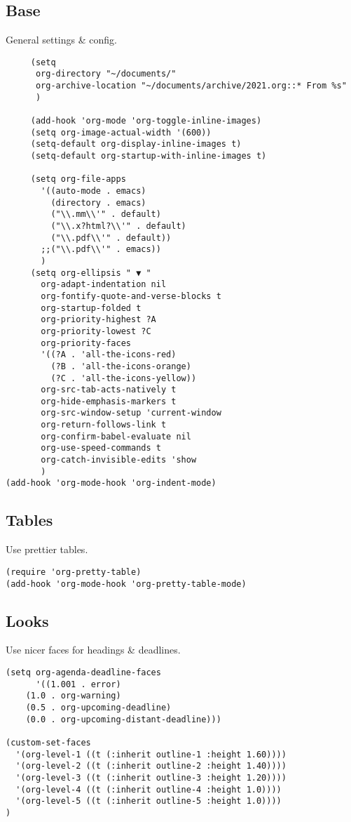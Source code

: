 \documentclass[11pt]{article}
\begin{document}
\subsection{Base}
\label{sec:org0ddaae1}
General settings \& config.
\begin{verbatim}
     (setq
      org-directory "~/documents/"
      org-archive-location "~/documents/archive/2021.org::* From %s"
      )

     (add-hook 'org-mode 'org-toggle-inline-images)
     (setq org-image-actual-width '(600))
     (setq-default org-display-inline-images t)
     (setq-default org-startup-with-inline-images t)

     (setq org-file-apps
	   '((auto-mode . emacs)
	     (directory . emacs)
	     ("\\.mm\\'" . default)
	     ("\\.x?html?\\'" . default)
	     ("\\.pdf\\'" . default)) 
	   ;;("\\.pdf\\'" . emacs))
	   )
     (setq org-ellipsis " ▼ "
	   org-adapt-indentation nil
	   org-fontify-quote-and-verse-blocks t
	   org-startup-folded t
	   org-priority-highest ?A
	   org-priority-lowest ?C
	   org-priority-faces
	   '((?A . 'all-the-icons-red)
	     (?B . 'all-the-icons-orange)
	     (?C . 'all-the-icons-yellow))
	   org-src-tab-acts-natively t
	   org-hide-emphasis-markers t
	   org-src-window-setup 'current-window
	   org-return-follows-link t
	   org-confirm-babel-evaluate nil
	   org-use-speed-commands t
	   org-catch-invisible-edits 'show
	   )
(add-hook 'org-mode-hook 'org-indent-mode)
\end{verbatim}
\subsection{Tables}
\label{sec:orgb62d908}
Use prettier tables.
\begin{verbatim}
(require 'org-pretty-table)
(add-hook 'org-mode-hook 'org-pretty-table-mode)
\end{verbatim}
\subsection{Looks}
\label{sec:org79b8676}
Use nicer faces for headings \& deadlines.
\begin{verbatim}
(setq org-agenda-deadline-faces
      '((1.001 . error)
	(1.0 . org-warning)
	(0.5 . org-upcoming-deadline)
	(0.0 . org-upcoming-distant-deadline)))

(custom-set-faces
  '(org-level-1 ((t (:inherit outline-1 :height 1.60))))
  '(org-level-2 ((t (:inherit outline-2 :height 1.40))))
  '(org-level-3 ((t (:inherit outline-3 :height 1.20))))
  '(org-level-4 ((t (:inherit outline-4 :height 1.0))))
  '(org-level-5 ((t (:inherit outline-5 :height 1.0))))
)
\end{verbatim}
\end{document}
